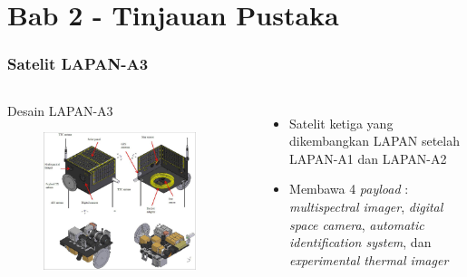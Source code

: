 \documentclass[8pt]{beamer}
\begin{document}
\begin{frame}
\end{frame}

\section{Bab 2 - Tinjauan Pustaka}

\begin{frame}
  \frametitle{Satelit LAPAN-A3}
  \begin{columns}[c]
      \begin{block}{\center Desain LAPAN-A3}
      \begin{figure}
          \includegraphics[width=0.9\textwidth]{figure/a3overview.jpg}
      \end{figure}
      \end{block}
      \begin{itemize}
        \item Satelit ketiga yang dikembangkan LAPAN setelah LAPAN-A1 dan LAPAN-A2
        \item Membawa 4 \textit{payload} : \textit{multispectral imager}, \textit{digital space camera}, \textit{automatic identification system}, dan \textit{experimental thermal imager} \cite{hartono2019}
      \end{itemize}
  \end{columns}
\end{frame}
\end{document}
